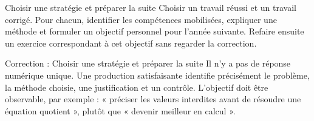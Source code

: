 \documentclass[aspectratio=169,10pt]{beamer}
\begin{document}
\begin{frame}{Choisir une stratégie et préparer la suite}
Choisir un travail réussi et un travail corrigé. Pour chacun, identifier les compétences mobilisées, expliquer une méthode et formuler un objectif personnel pour l'année suivante. Refaire ensuite un exercice correspondant à cet objectif sans regarder la correction.
\end{frame}
\begin{frame}{Correction : Choisir une stratégie et préparer la suite}
Il n'y a pas de réponse numérique unique. Une production satisfaisante identifie précisément le problème, la méthode choisie, une justification et un contrôle. L'objectif doit être observable, par exemple : « préciser les valeurs interdites avant de résoudre une équation quotient », plutôt que « devenir meilleur en calcul ».
\end{frame}
\end{document}
